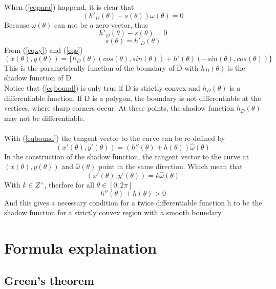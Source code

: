 \documentclass[a4paper]{article}
\begin{document}
When (\ref{eqpara}) happend, it is clear that 
\begin{equation*}
    (h'_D(\theta) - s(\theta))\omega(\theta) = 0
\end{equation*}
Because $\omega(\theta)$ can not be a zero vector, thus
\begin{equation*}
    h'_D(\theta) - s(\theta) = 0
\end{equation*}
\begin{equation}\label{eqs}
    s(\theta) = h'_D(\theta) 
\end{equation}
From (\ref{eqxy}) and (\ref{eqs})
\begin{equation}\label{eqbound}
    (x(\theta),y(\theta)) = \{h_D(\theta)(cos(\theta),sin(\theta)) + h'(\theta)(-sin(\theta),cos(\theta))\}
\end{equation}
This is the parametrically function of the boundary of D with $h_D(\theta)$ is the shadow function of D.\\

\noindent Notice that (\ref{eqbound}) is only true if D is strictly convex and $h_D(\theta)$ is a differentiable function. If D is a polygon, the boundary is not differentiable at the vertices, where sharp corners occur. At these points, the shadow function $h_D(\theta)$ may not be differentiable.\\ \\
With (\ref{eqbound}) the tangent vector to the curve can be re-defined by
\begin{equation*}
    (x'(\theta),y'(\theta)) = (h''(\theta) + h(\theta))\hat{\omega}(\theta)
\end{equation*}
In the construction of the shadow function, the tangent vector to the curve at $(x(\theta),y(\theta))$ and $\hat{\omega}(\theta)$ point in the same direction. Which mean that
\begin{equation*}
    (x'(\theta),y'(\theta)) = k \hat{\omega}(\theta)
\end{equation*}
With $k \in Z^+$, therfore for all $\theta \in [0,2\pi]$
\begin{equation}\label{seconddiff}
    h''(\theta) + h(\theta) > 0
\end{equation}
And this gives a necessary condition for a twice differentiable function h to be the shadow function for a strictly convex region with a smooth boundary. 
\section{Formula explaination}
\subsection{Green's theorem}
\end{document}
